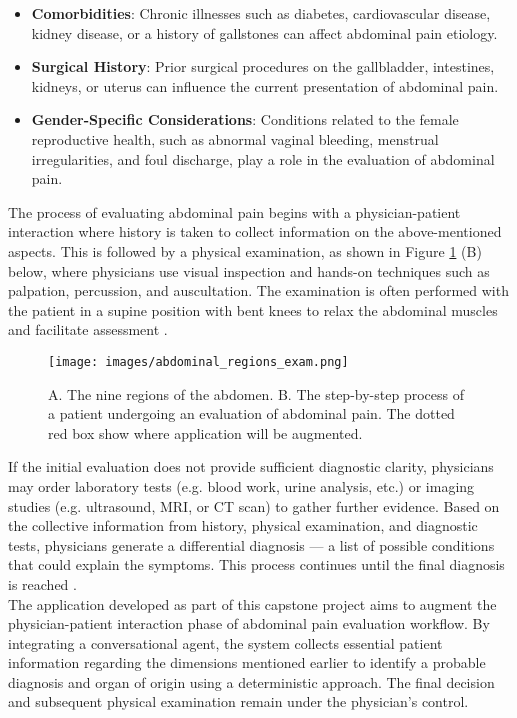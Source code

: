 \begin{itemize}
    \item \textcolor{TUMRed}{\textbf{Comorbidities}}: Chronic illnesses such as diabetes, cardiovascular disease, kidney disease, or a history of gallstones can affect abdominal pain etiology.
    \item \textcolor{TUMRed}{\textbf{Surgical History}}: Prior surgical procedures on the gallbladder, intestines, kidneys, or uterus can influence the current presentation of abdominal pain.
    \item \textcolor{TUMRed}{\textbf{Gender-Specific Considerations}}: Conditions related to the female reproductive health, such as abnormal vaginal bleeding, menstrual irregularities, and foul discharge, play a role in the evaluation of abdominal pain.
\end{itemize}
\noindent The process of evaluating abdominal pain begins with a physician-patient interaction where history is taken to collect information on the above-mentioned aspects. This is followed by a physical examination, as shown in Figure \ref{fig:abdominal_regions} (B) below, where physicians use visual inspection and hands-on techniques such as palpation, percussion, and auscultation. The examination is often performed with the patient in a supine position with bent knees to relax the abdominal muscles and facilitate assessment \cite{AbExm, cartwright2008evaluation}.
\begin{figure}[H]
    \centering
    \texttt{[image: images/abdominal\_regions\_exam.png]}
    \caption{A. The nine regions of the abdomen. B. The step-by-step process of a patient undergoing an evaluation of abdominal pain. The dotted red box show where application will be augmented.} 
    \label{fig:abdominal_regions}
\end{figure}

\noindent If the initial evaluation does not provide sufficient diagnostic clarity, physicians may order laboratory tests (e.g. blood work, urine analysis, etc.) or imaging studies (e.g. ultrasound, MRI, or CT scan) to gather further evidence. Based on the collective information from history, physical examination, and diagnostic tests, physicians generate a differential diagnosis --- a list of possible conditions that could explain the symptoms. This process continues until the final diagnosis is reached \cite{ddCleveland}.\\[\baselineskip]

\noindent The application developed as part of this capstone project aims to augment the physician-patient interaction phase of abdominal pain evaluation workflow. By integrating a conversational agent, the system collects essential patient information regarding the dimensions mentioned earlier to identify a probable diagnosis and organ of origin using a deterministic approach. The final decision and subsequent physical examination remain under the physician's control.

